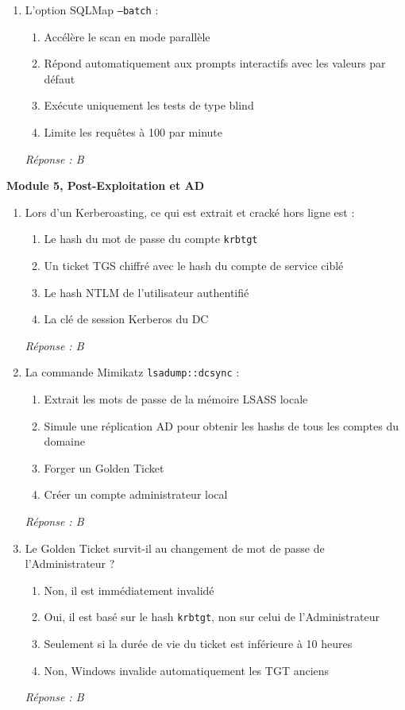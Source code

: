 \begin{enumerate}[resume]
\item L'option SQLMap \texttt{--batch} :
\begin{enumerate}[label=\Alph*.]
    \item Accélère le scan en mode parallèle
    \item Répond automatiquement aux prompts interactifs avec les valeurs par défaut
    \item Exécute uniquement les tests de type blind
    \item Limite les requêtes à 100 par minute
\end{enumerate}
\textit{Réponse : B}

\end{enumerate}

\medskip
\noindent\textbf{Module 5, Post-Exploitation et AD}

\begin{enumerate}[resume]

\item Lors d'un Kerberoasting, ce qui est extrait et cracké hors ligne est :
\begin{enumerate}[label=\Alph*.]
    \item Le hash du mot de passe du compte \texttt{krbtgt}
    \item Un ticket TGS chiffré avec le hash du compte de service ciblé
    \item Le hash NTLM de l'utilisateur authentifié
    \item La clé de session Kerberos du DC
\end{enumerate}
\textit{Réponse : B}

\item La commande Mimikatz \texttt{lsadump::dcsync} :
\begin{enumerate}[label=\Alph*.]
    \item Extrait les mots de passe de la mémoire LSASS locale
    \item Simule une réplication AD pour obtenir les hashs de tous les comptes du domaine
    \item Forger un Golden Ticket
    \item Créer un compte administrateur local
\end{enumerate}
\textit{Réponse : B}

\item Le Golden Ticket survit-il au changement de mot de passe de l'Administrateur ?
\begin{enumerate}[label=\Alph*.]
    \item Non, il est immédiatement invalidé
    \item Oui, il est basé sur le hash \texttt{krbtgt}, non sur celui de l'Administrateur
    \item Seulement si la durée de vie du ticket est inférieure à 10 heures
    \item Non, Windows invalide automatiquement les TGT anciens
\end{enumerate}
\textit{Réponse : B}


\end{enumerate}
